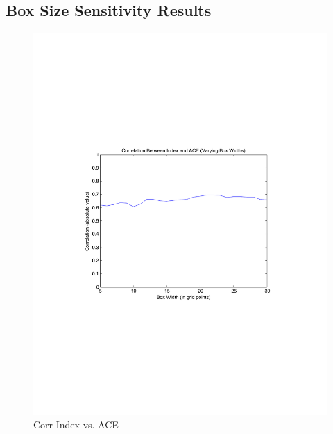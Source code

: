 \documentclass[]{article}
\begin{document}
\subsection{Box Size Sensitivity Results}
\begin{figure}[ht]
\begin{minipage}[b]{0.6\linewidth}
\includegraphics[width=\textwidth]{figures/sensitivityResults/boxSize/ACE_Index_Box_Size.pdf}
\caption{Corr Index vs. ACE}
\label{fig:figure1}
\end{minipage}
\hspace{0cm}
\begin{minipage}[b]{0.6\linewidth}

\end{minipage}
\end{figure}
\end{document}
